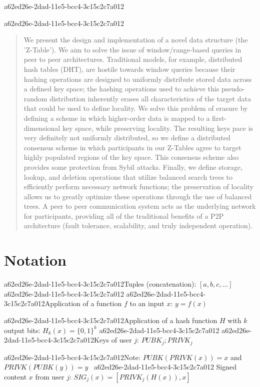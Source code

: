 \documentclass[12pt]{article}
\begin{document}
a62ed26e-2dad-11e5-bcc4-3c15c2c7a012
\maketitle
a62ed26e-2dad-11e5-bcc4-3c15c2c7a012
\begin{abstract}
We present the design and implementation of a novel data structure (the 'Z-Table'). We aim to solve the issue of window/range-based queries in peer to peer architectures. Traditional models, for example,  distributed hash tables (DHT), are hostile towards window queries because their hashing operations are designed to uniformly distribute stored data across a defined key space; the hashing operations used to achieve this pseudo-random distribution inherently erases all characteristics of the target data that could be used to define locality. We solve this problem of erasure by defining a scheme in which higher-order data is mapped to a first-dimensional key space, while preserving locality. The resulting keys pace is very definitely not uniformly distributed, so we define a distributed consensus scheme in which participants in our Z-Tables agree to target highly populated regions of the key space. This consensus scheme also provides some protection from Sybil attacks. Finally, we define storage, lookup, and deletion operations that utilize balanced search trees to efficiently perform necessary network functions; the preservation of locality allows us to greatly optimize these operations through the use of balanced trees. A peer to peer communication system acts as the underlying network for participants, providing all of the traditional benefits of a P2P architecture (fault tolerance, scalability, and truly independent operation).
\end{abstract}

\section{Notation}

a62ed26e-2dad-11e5-bcc4-3c15c2c7a012Tuples (concatenation): $[a,b,c,...]$
a62ed26e-2dad-11e5-bcc4-3c15c2c7a012
a62ed26e-2dad-11e5-bcc4-3c15c2c7a012Application of a function $f$ to an input $x$: $y=f(x)$

a62ed26e-2dad-11e5-bcc4-3c15c2c7a012Application of a hash function $H$ with $k$ output bits: $H_{k}(x) = \{0,1\}^k$
a62ed26e-2dad-11e5-bcc4-3c15c2c7a012
a62ed26e-2dad-11e5-bcc4-3c15c2c7a012Keys of user $j$: $ PUBK_j; PRIVK_j $

a62ed26e-2dad-11e5-bcc4-3c15c2c7a012Note: $PUBK(PRIVK(x)) = x$ and $PRIVK(PUBK(y)) = y$~
a62ed26e-2dad-11e5-bcc4-3c15c2c7a012
Signed content $x$ from user $j$: $SIG_j(x) = \left[ PRIVK_j( H(x) ), x \right]$
\end{document}
